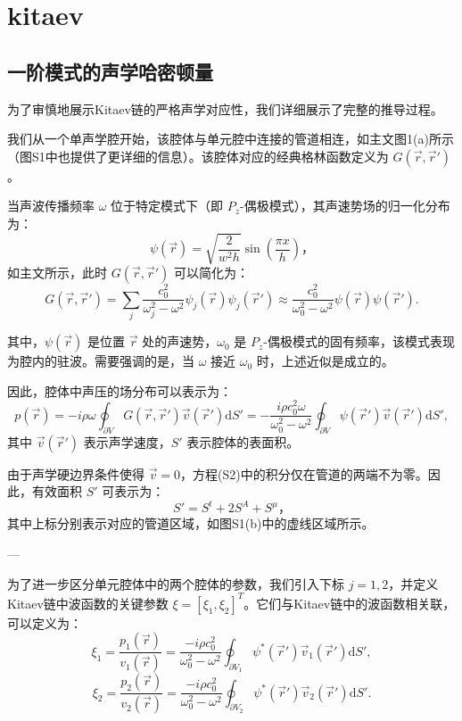 \chapter{kitaev}

\section{一阶模式的声学哈密顿量}

为了审慎地展示Kitaev链的严格声学对应性，我们详细展示了完整的推导过程。

我们从一个单声学腔开始，该腔体与单元腔中连接的管道相连，如主文图1(a)所示（图S1中也提供了更详细的信息）。该腔体对应的经典格林函数定义为 \( G(\vec{r}, \vec{r}') \)。

当声波传播频率 \( \omega \) 位于特定模式下（即 \( P_z \)-偶极模式），其声速势场的归一化分布为：
\[
\psi(\vec{r}) = \sqrt{\frac{2}{w^2 h}} \sin\left(\frac{\pi x}{h}\right)，
\]
如主文所示，此时 \( G(\vec{r}, \vec{r}') \) 可以简化为：
\[
G(\vec{r}, \vec{r}') = \sum_j \frac{c_0^2}{\omega_j^2 - \omega^2} \psi_j(\vec{r}) \psi_j(\vec{r}')
\approx \frac{c_0^2}{\omega_0^2 - \omega^2} \psi(\vec{r}) \psi(\vec{r}'). 
\]

其中，\( \psi(\vec{r}) \) 是位置 \( \vec{r} \) 处的声速势，\( \omega_0 \) 是 \( P_z \)-偶极模式的固有频率，该模式表现为腔内的驻波。需要强调的是，当 \( \omega \) 接近 \( \omega_0 \) 时，上述近似是成立的。

因此，腔体中声压的场分布可以表示为：
\[
p(\vec{r}) = -i \rho \omega \oint_{\partial V} G(\vec{r}, \vec{r}') \vec{v}(\vec{r}') \mathrm{d}S'
= -\frac{i \rho c_0^2 \omega}{\omega_0^2 - \omega^2} \oint_{\partial V} \psi(\vec{r}') \vec{v}(\vec{r}') \mathrm{d}S', 
\]
其中 \( \vec{v}(\vec{r}') \) 表示声学速度，\( S' \) 表示腔体的表面积。

由于声学硬边界条件使得 \( \vec{v} = 0 \)，方程(S2)中的积分仅在管道的两端不为零。因此，有效面积 \( S' \) 可表示为：
\[
S' = S^t + 2S^A + S^\mu，
\]
其中上标分别表示对应的管道区域，如图S1(b)中的虚线区域所示。

---

为了进一步区分单元腔体中的两个腔体的参数，我们引入下标 \( j = 1, 2 \)，并定义Kitaev链中波函数的关键参数 \( \xi = [\xi_1, \xi_2]^T \)。它们与Kitaev链中的波函数相关联，可以定义为：
\[
\xi_1 = \frac{p_1(\vec{r})}{v_1(\vec{r})} = \frac{-i \rho c_0^2}{\omega_0^2 - \omega^2} \oint_{\partial V_1} \psi^*(\vec{r}') \vec{v}_1(\vec{r}') \mathrm{d}S',
\]
\[
\xi_2 = \frac{p_2(\vec{r})}{v_2(\vec{r})} = \frac{-i \rho c_0^2}{\omega_0^2 - \omega^2} \oint_{\partial V_2} \psi^*(\vec{r}') \vec{v}_2(\vec{r}') \mathrm{d}S'. 
\]


